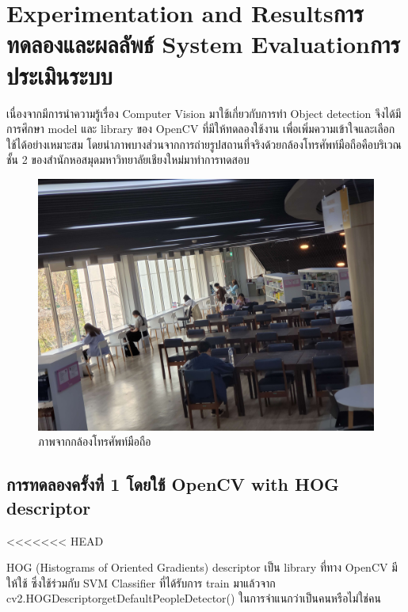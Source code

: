 \chapter{\ifproject%
\ifenglish Experimentation and Results\else การทดลองและผลลัพธ์\fi
\else%
\ifenglish System Evaluation\else การประเมินระบบ\fi
\fi}

\hspace{10mm} เนื่องจากมีการนำความรู้เรื่อง Computer Vision มาใช้เกี่ยวกับการทำ Object detection จึงได้มีการศึกษา model และ library
ของ OpenCV ที่มีให้ทดลองใช้งาน เพื่อเพิ่มความเข้าใจและเลือกใช้ได้อย่างเหมาะสม โดยนำภาพบางส่วนจากการถ่ายรูปสถานที่จริงด้วยกล้องโทรศัพท์มือถือคือบริเวณชั้น 2
ของสำนักหอสมุดมหาวิทยาลัยเชียงใหม่มาทำการทดสอบ

\begin{figure}[h]
    \centering
    \includegraphics[scale=0.07]{images/cam2-2.jpg}
    \caption[camera]{ภาพจากกล้องโทรศัพท์มือถือ}
    \label{fig:camera}
\end{figure}

\section{การทดลองครั้งที่ 1 โดยใช้ OpenCV with HOG descriptor}
<<<<<<< HEAD

\hspace{10mm}HOG (Histograms of Oriented Gradients) descriptor เป็น library ที่ทาง OpenCV มีให้ใช้
ซึ่งใช้ร่วมกับ SVM Classifier ที่ได้รับการ train มาแล้วจาก cv2.HOGDescriptor\textunderscore getDefaultPeopleDetector()
ในการจำแนกว่าเป็นคนหรือไม่ใช่คน


